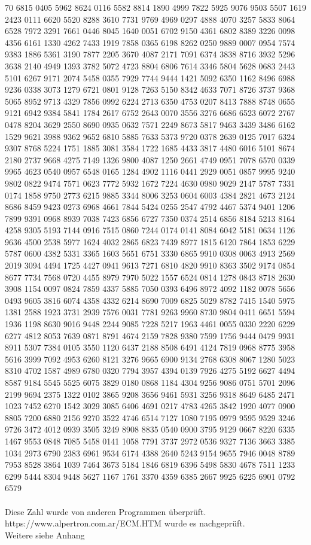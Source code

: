 70 6815 0405
5962 8624 0116 5582 8814
1890 4999 7822 5925 9076
9503 5507 1619 2423 0111
6620 5520 8288 3610 7731
9769 4969 0297 4888 4070
3257 5833 8064 6528 7972
3291 7661 0446 8045 1640
0051 6702 9150 4361 6802
8389 3226 0098 4356 6161
1330 4262 7433 1919 7858
0365 6198 8262 0250 9889
0007 0954 7574 9383 1886
5361 3190 7877 2205 3670
4087 2171 7091 6374 3838
8716 3932 5296 3638 2140
4949 1393 3782 5072 4723
8804 6806 7614 3346 5804
5628 0683 2443 5101 6267
9171 2074 5458 0355 7929
7744 9444 1421 5092 6350
1162 8496 6988 9236 0338
3073 1279 6721 0801 9128
7263 5150 8342 4633 7071
8726 3737 9368 5065 8952
9713 4329 7856 0992 6224
2713 6350 4753 0207 8413
7888 8748 0655 9121 6942
9384 5841 1784 2617 6752
2643 0070 3556 3276 6686
6523 6072 2767 0478 8204
3629 2550 8690 0935 0632
7571 2249 8673 5817 9463
3439 3486 6162 1529 9621
3988 9362 9652 6810 5885
7633 5373 9720 0378 2639
0125 7017 6324 9307 8768
5224 1751 1885 3081 3584
1722 1685 4433 3817 4480
6016 5101 8674 2180 2737
9668 4275 7149 1326 9800
4087 1250 2661 4749 0951
7078 6570 0339 9965 4623
0540 0957 6548 0165 1284
4902 1116 0441 2929 0051
0857 9995 9240 9802 0822
9474 7571 0623 7772 5932
1672 7224 4630 0980 9029
2147 5787 7331 0174 1858
9750 2773 6215 9885 3344
8006 3253 0604 6003 4384
2821 4673 2124 8686 8459
9423 0273 6968 4661 7844
5424 0255 2547 4792 4467
5374 9401 1206 7899 9391
0968 8939 7038 7423 6856
6727 7350 0374 2514 6856
8184 5213 8164 4258 9305
5193 7144 0916 7515 0860
7244 0174 0141 8084 6042
5181 0634 1126 9636 4500
2538 5977 1624 4032 2865
6823 7439 8977 1815 6120
7864 1853 6229 5787 0600
4382 5331 3365 1603 5651
6751 3330 6865 9910 0308
0063 4913 2569 2019 3094
4494 1725 4427 0941 9613
7271 6810 4820 9910 8363
3502 9174 0854 8677 7734
7568 0720 4455 8979 7970
5022 1557 6524 0814 1278
0843 8718 2630 3908 1154
0097 0824 7859 4337 5885
7050 0393 6496 8972 4092
1182 0078 5656 0493 9605
3816 6074 4358 4332 6214
8690 7009 6825 5029 8782
7415 1540 5975 1381 2588
1923 3731 2939 7576 0031
7781 9263 9960 8730 9804
0411 6651 5594 1936 1198
8630 9016 9448 2244 9085
7228 5217 1963 4461 0055
0330 2220 6229 6277 4812
8053 7639 0871 8791 4674
2159 7828 9380 7599 1756
9444 0479 9931 8911 5307
7384 0105 3550 1120 6437
2188 8508 6491 4124 7819
0968 8775 3958 5616 3999
7092 4953 6260 8121 3276
9665 6900 9134 2768 6308
8067 1280 5023 8310 4702
1587 4989 6780 0320 7794
3957 4394 0139 7926 4275
5192 6627 4494 8587 9184
5545 5525 6075 3829 0180
0868 1184 4304 9256 9086
0751 5701 2096 2199 9694
2375 1322 0102 3865 9208
3656 9461 5931 3256 9318
8649 6485 2471 1023 7452
6270 1542 3029 3085 6406
4691 0217 4783 4265 3842
1920 4077 0900 8805 7200
6880 2156 9270 3522 4746
6514 7127 1080 7195 0979
9595 9529 3246 9726 3472
4012 0939 3505 3249 8908
8835 0540 0900 3795 9129
0667 8220 6335 1467 9553
0848 7085 5458 0141 1058
7791 3737 2972 0536 9327
7136 3663 3385 1034 2973
6790 2383 6961 9534 6174
4388 2640 5243 9154 9655
7946 0048 8789 7953 8528
3864 1039 7464 3673 5184
1846 6819 6396 5498 5830
4678 7511 1233 6299 5444
8304 9448 5627 1167 1761
3370 4359 6385 2667 9925
6225 6901 0792 6579 
\\
\\
Diese Zahl wurde von anderen Programmen überprüft. https://www.alpertron.com.ar/ECM.HTM wurde es nachgeprüft.
\\
Weitere siehe Anhang\\
\newpage
